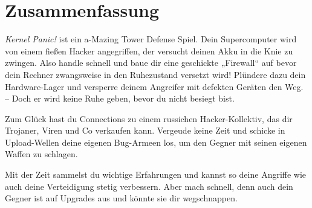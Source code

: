 \section{Zusammenfassung}


\textit{Kernel Panic!} ist ein a-Mazing Tower Defense Spiel.
Dein Supercomputer wird von einem fießen Hacker angegriffen, der versucht deinen Akku in die Knie zu zwingen.
Also handle schnell und baue dir eine geschickte „Firewall“ auf bevor dein Rechner zwangsweise in den Ruhezustand versetzt wird! Plündere dazu dein Hardware-Lager und versperre deinem Angreifer mit defekten Geräten den Weg. -- Doch er wird keine Ruhe geben, bevor du nicht besiegt bist.

Zum Glück hast du Connections zu einem russichen Hacker-Kollektiv, das dir Trojaner, Viren und Co verkaufen kann. Vergeude keine Zeit und schicke in Upload-Wellen deine eigenen Bug-Armeen los, um den Gegner mit seinen eigenen Waffen zu schlagen.

Mit der Zeit sammelst du wichtige Erfahrungen und kannst so deine Angriffe wie auch deine Verteidigung stetig verbessern. Aber mach schnell, denn auch dein Gegner ist auf Upgrades aus und könnte sie dir wegschnappen.
